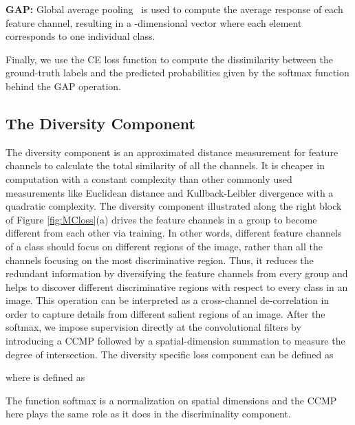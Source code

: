 \documentclass[journal]{IEEEtran}
\begin{document}
\noindent \textbf{GAP:} Global average pooling~\cite{lin2013network} is used to compute the average response of each feature channel, resulting in a -dimensional vector where each element corresponds to one individual class.

Finally, we use the CE loss function  to compute the dissimilarity between the ground-truth labels and the predicted probabilities given by the softmax function behind the GAP operation.




\subsection{The Diversity Component}

The diversity component is an approximated distance measurement for feature channels to calculate the total similarity of all the channels. It is cheaper in computation with a constant complexity than other commonly used measurements like Euclidean distance and Kullback-Leibler divergence with a quadratic complexity. The diversity component illustrated along the right block of Figure \ref{fig:MCloss}(a) drives the feature channels in a group  to become different from each other via training. In other words, different feature channels of a class should focus on different regions of the image, rather than all the channels focusing on the most discriminative region. Thus, it reduces the redundant information by diversifying the feature channels from  every group and helps to discover different discriminative regions with respect to every class in an image. This operation can be interpreted as a cross-channel de-correlation in order to capture details from different salient regions of an image. After the softmax, we impose supervision directly at the convolutional filters by introducing a CCMP followed by a spatial-dimension summation to measure the degree of intersection. The diversity specific loss component  can be defined as



\noindent where  is defined as 



\noindent The function softmax is a normalization on spatial dimensions and the CCMP here plays the same role as it does in the discriminality component.
\end{document}
